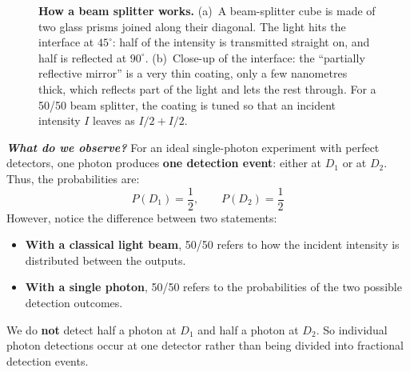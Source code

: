 \begin{figure}[!htp]
    \caption{%
        \textbf{How a beam splitter works.}
        (a)~A beam-splitter cube is made of two glass prisms joined along their diagonal.
        The light hits the interface at $45^\circ$: half of the intensity is transmitted straight on,
        and half is reflected at $90^\circ$.
        (b)~Close-up of the interface: the ``partially reflective mirror'' is a very thin coating,
        only a few nanometres thick, which reflects part of the light and lets the rest through.
        For a 50/50 beam splitter, the coating is tuned so that an incident intensity $I$
    leaves as $I/2 + I/2$.}
    \label{fig:beam-splitter-cube-and-coating}
\end{figure}

\noindent
\emph{\textbf{What do we observe?}} For an ideal single-photon experiment with perfect detectors, one photon produces \textbf{one detection event}: either at $D_1$ or at $D_2$. Thus, the probabilities are:
\begin{equation*}
    P(D_1)=\frac{1}{2},\qquad P(D_2)=\frac{1}{2}
\end{equation*}
However, notice the difference between two statements:
\begin{itemize}
    \item \textbf{With a classical light beam}, 50/50 refers to how the incident intensity is distributed between the outputs.
    \item \textbf{With a single photon}, 50/50 refers to the probabilities of the two possible detection outcomes.
\end{itemize}
We do \textbf{not} detect half a photon at $D_1$ and half a photon at $D_2$. So individual photon detections occur at one detector rather than being divided into fractional detection events.

